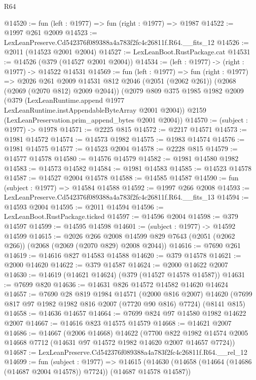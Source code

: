 \begin{lexlean}{R64}
\begin{coremodule}
@14520 := fun (left : @1977) => fun (right : @1977) => @1987
@14522 := @1997 @261 @2009
@14523 := LexLeanPreserve.Cd542376f089388a4a783f2fc4c26811f.R64.__fits_12
@14526 := @2011 (@14523 @2001 @2004)
@14527 := LexLeanBoot.RustPackage.cat
@14531 := @14526 (@379 (@14527 @2001 @2004))
@14534 := (left : @1977) -> (right : @1977) -> @14522 @14531
@14569 := fun (left : @1977) =>
  fun (right : @1977) =>
  @2026
    @261
    @2009
    @14531
    @812
    @2046
    (@2051 (@2062 @261))
    (@2068 (@2069 (@2070 @812) @2009 @2044))
    (@2079
      @809
      @375
      @1985
      @1982
      @2009
      (@379 (LexLeanRuntime.append @1977 LexLeanRuntime.instAppendableByteArray @2001 @2004))
      @2159
      (LexLeanPreservation.prim_append_bytes @2001 @2004))
@14570 := (subject : @1977) -> @1978
@14571 := @2225 @815
@14572 := @2217 @14571
@14573 := @1981 @14572
@14574 := @14573 @1982
@14575 := @1983 @14574
@14576 := @1981 @14575
@14577 := @14523 @2004
@14578 := @2228 @815
@14579 := @14577 @14578
@14580 := @14576 @14579
@14582 := @1981 @14580 @1982
@14583 := @14573 @14582
@14584 := @1981 @14583
@14585 := @14523 @14578
@14587 := @14527 @2004 @14578
@14588 := @14585 @14587
@14590 := fun (subject : @1977) => @14584 @14588
@14592 := @1997 @266 @2008
@14593 := LexLeanPreserve.Cd542376f089388a4a783f2fc4c26811f.R64.__fits_13
@14594 := @14593 @2004
@14595 := @2011 @14594
@14596 := LexLeanBoot.RustPackage.ticked
@14597 := @14596 @2004
@14598 := @379 @14597
@14599 := @14595 @14598
@14601 := (subject : @1977) -> @14592 @14599
@14615 := @2026
    @266
    @2008
    @14599
    @829
    @7643
    (@2051 (@2062 @266))
    (@2068 (@2069 (@2070 @829) @2008 @2044))
@14616 := @7690 @261
@14619 := @14616 @827 @14583 @14588
@14620 := @379 @14578
@14621 := @2000 @14620
@14622 := @379 @14587
@14624 := @2000 @14622 @2007
@14630 := @14619 (@14621 @14624) (@379 (@14527 @14578 @14587))
@14631 := @7699 @820
@14636 := @14631 @826 @14572 @14582 @14620 @14624
@14657 := @7690
    @28
    @819
    @1984
    @14571
    (@2000 @816 @2007)
    @14620
    (@7699 @817 @97 @1982 @1982 @816 @2007 (@7720 @90 @816) @7724)
    (@8141 @815)
@14658 := @14636 @14657
@14664 := @7699 @824 @97 @14580 @1982 @14622 @2007
@14667 := @14616 @823 @14575 @14579
@14668 := @14621 @2007
@14686 := @14667
    (@2006 @14668)
    @14622
    (@7700 @822 @1982 @14574 @2005 @14668 @7712 (@14631 @97 @14572 @1982 @14620 @2007 @14657 @7724))
@14687 := LexLeanPreserve.Cd542376f089388a4a783f2fc4c26811f.R64.__rel_12
@14699 := fun (subject : @1977) =>
  @14615 (@14630 (@14658 (@14664 (@14686 (@14687 @2004 @14578)) @7724)) (@14687 @14578 @14587))

\end{coremodule}
\end{lexlean}
